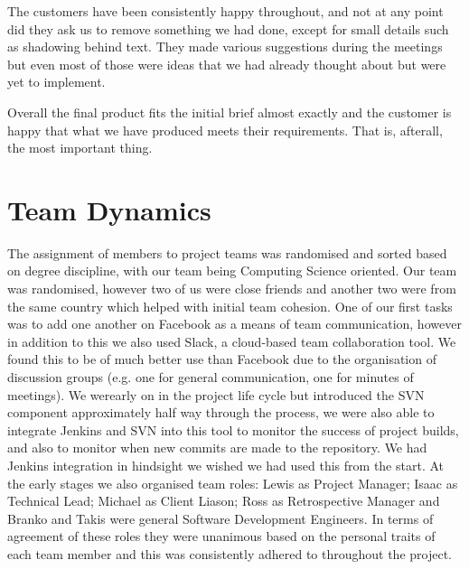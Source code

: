 \documentclass{l3proj}
\begin{document}
The customers have been consistently happy throughout, and not at any point did they ask us to remove something we had done, except for small details such
as shadowing behind text. They made various suggestions during the meetings but even most of those were ideas that we had already thought about but were
yet to implement.

Overall the final product fits the initial brief almost exactly and the customer is happy that what we have produced meets their requirements. That
is, afterall, the most important thing.



\section{Team Dynamics}
\label{sec:team-dynamics}

The assignment of members to project teams was randomised and sorted based on degree discipline, with our team being
Computing Science oriented. Our team was randomised, however two of us were close friends and another two were from the
same country which helped with initial team cohesion. One of our first tasks was to add one another on Facebook as a means of
team communication, however in addition to this we also used Slack, a cloud-based team collaboration tool. We found this to
be of much better use than Facebook due to the organisation of discussion groups (e.g. one for general communication, one for
minutes of meetings). We werearly on in the project life cycle
but introduced the SVN component approximately half way through the process, we were also able to integrate Jenkins and SVN into this tool to monitor the success of project builds,
and also to monitor when new commits are made to the repository. We had Jenkins integration in hindsight we wished we had used this from the
start. At the early stages we also organised team roles: Lewis as Project Manager; Isaac as Technical Lead; Michael as Client Liason;
Ross as Retrospective Manager and Branko and Takis were general Software Development Engineers. In terms of agreement of these roles they were unanimous
based on the personal traits of each team member and this was consistently adhered to throughout the project.
\end{document}
